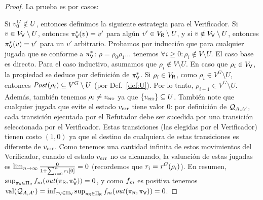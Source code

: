 \begin{proof} La prueba es por casos:
	
	Si $\InitVertex^G \notin U$, entonces definimos la siguiente estrategia para el Verificador. Si $v \in V_\Verifier \setminus U$, entonces $\pi^*_\Verifier(v)=v'$ 
	para algún $v' \in V_\Refuter \setminus U$, y si $v \notin  V_\Verifier \setminus U$, entonces $\pi^*_\Verifier(v) = v'$ para un $v'$ arbitrario. 
	Probamos por inducción que para cualquier jugada que se conforme a $\pi^*_\Verifier$: $\rho =\rho_0 \rho_1 \dots$ tenemos $\forall i \geq 0: \rho_i \notin V \setminus U$. El caso base es directo. 
Para el caso inductivo, asumamos que $\rho_i \notin V \setminus U$. En caso que $\rho_i \in V_\Verifier$, la propiedad se deduce por definición de
$\pi^*_\Verifier$. Si $\rho_i \in V_\Refuter$, como $\rho_i \in V^G \setminus U$, entonces $\post(\rho_i) \subseteq V^G \setminus U$ (por Def.~\ref{def:U}). 
Por lo tanto, $\rho_{i+1} \in V^G \setminus U$. 
	 Además, también tenemos $\rho_i \neq \ErrorSt$ ya que $\{ \ErrorSt \} \subseteq U$. También note que cualquier jugada que evite el estado $\ErrorSt$ tiene valor $0$: por definición de $\QMStrGame$, cada transición ejecutada por el Refutador debe ser sucedida por una transición seleccionada por el Verificador. Estas transiciones (las elegidas por el Verificador) tienen costo $(1,0)$ ya que el destino de cualquiera de estas transiciones es diferente de $\ErrorSt$. Como tenemos una cantidad infinita de estos movimientos del Verificador, cuando el estado $\ErrorSt$ no es alcanzado, la valuación de estas jugadas es $\lim_{n\rightarrow \infty} \frac{0}{1+ \sum^n_{i=0} \pr{0}{r_i}} = 0$ (recordemos que $r_i = \reward^G(\rho_i)$). 
En resumen, $\sup_{\pi_\Refuter \in \Pi_\Refuter} \FMask(\out(\pi_\Refuter, \pi^*_\Verifier)) = 0$, y como $\FMask$ es positiva
tenemos $\val(\QMStrGame) = \inf_{\pi_\Verifier \in \Pi_\Verifier} \sup_{\pi_\Refuter \in \Pi_\Refuter} \FMask(\out(\pi_\Refuter, \pi_\Verifier)) = 0$.


\end{proof}

